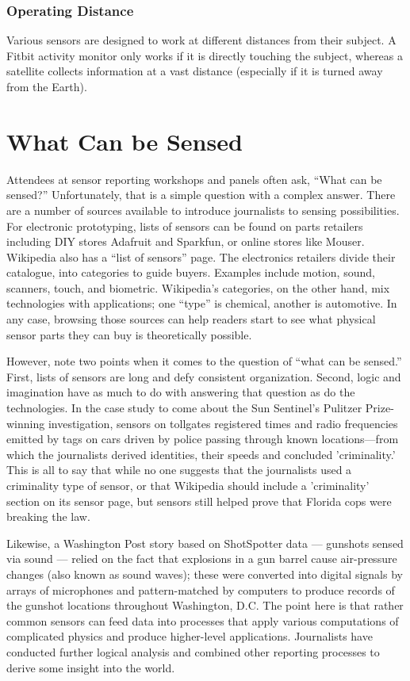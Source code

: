 \subsection{Operating Distance}
Various sensors are designed to work at different distances from their subject.
A Fitbit activity monitor only works if it is directly touching the subject,
whereas a satellite collects information at a vast distance (especially if
it is turned away from the Earth).

\chapter{What Can be Sensed}
Attendees at sensor reporting workshops and panels often ask, ``What can
be sensed?'' Unfortunately, that is a simple question with a complex answer.
There are a number of sources available to introduce journalists to sensing
possibilities. For electronic prototyping, lists of sensors can be found on
parts retailers including DIY stores Adafruit and Sparkfun, or online stores
like Mouser. Wikipedia also has a ``list of sensors'' page. The electronics
retailers divide their catalogue, into categories to guide buyers. Examples
include motion, sound, scanners, touch, and biometric. Wikipedia's categories,
on the other hand, mix technologies with applications; one ``type''
is chemical, another is automotive. In any case, browsing those sources
can help readers start to see what physical sensor parts they can buy is
theoretically possible.

However, note two points when it comes to the question of ``what can be
sensed.'' First, lists of sensors are long and defy consistent organization. Second,
logic and imagination have as much to do with answering that question
as do the technologies. In the case study to come about the Sun Sentinel's
Pulitzer Prize-winning investigation, sensors on tollgates registered times
and radio frequencies emitted by tags on cars driven by police passing
through known locations—from which the journalists derived identities,
their speeds and concluded 'criminality.' This is all to say that while no one
suggests that the journalists used a criminality type of sensor, or that Wikipedia
should include a 'criminality' section on its sensor page, but sensors
still helped prove that Florida cops were breaking the law.

Likewise, a Washington Post story based on ShotSpotter data — gunshots
sensed via sound — relied on the fact that explosions in a gun barrel cause
air-pressure changes (also known as sound waves); these were converted
into digital signals by arrays of microphones and pattern-matched by computers
to produce records of the gunshot locations throughout Washington,
D.C. The point here is that rather common sensors can feed data into processes
that apply various computations of complicated physics and produce
higher-level applications. Journalists have conducted further logical analysis
and combined other reporting processes to derive some insight into
the world.

